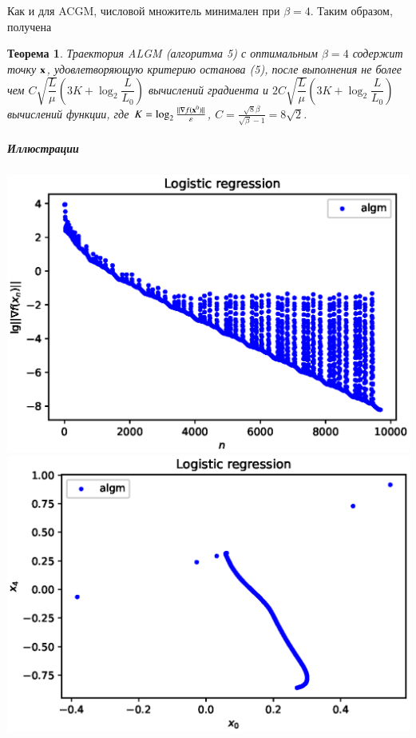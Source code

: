 \documentclass{crm-article}
\newtheorem{theorems}{Теорема}
\begin{document}
Как и для ACGM, числовой множитель минимален при $\beta=4$.
Таким образом, получена
\begin{theorems}
Траектория ALGM (алгоритма 5) с оптимальным $\beta=4$ содержит точку ${\bf x}$, удовлетворяющую критерию останова (5), после выполнения не более чем $C \sqrt{\dfrac{L}{\mu}} \left(3K+\log_2\dfrac{L}{L_0}\right)$ вычислений градиента и $2C \sqrt{\dfrac{L}{\mu}} \left(3K+\log_2\dfrac{L}{L_0}\right)$ вычислений функции, где $K=\log_2\frac{||\nabla f({\bf x}^0)||}{\varepsilon}$, $C=\frac{\sqrt{8}\beta}{\sqrt{\beta}-1}=8\sqrt{2}$.
\end{theorems}

\subparagraph{Иллюстрации}

\noindent
\includegraphics[scale=0.5]{plots/ill_algm_logr_des.eps}
\includegraphics[scale=0.5]{plots/xy_algm_logr_des.eps}
\end{document}
